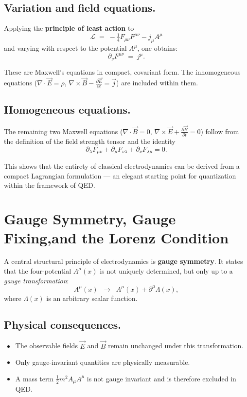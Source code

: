 \subsection*{Variation and field equations.}
Applying the \textbf{principle of least action} to
\[
\mathcal{L} \;=\; -\tfrac{1}{4} F_{\mu\nu}F^{\mu\nu} - j_\mu A^\mu
\]
and varying with respect to the potential \( A^\mu \), one obtains:
\[
\partial_\nu F^{\mu\nu} \;=\; j^\mu .
\]

These are Maxwell’s equations in compact, 
covariant form. The inhomogeneous equations
(\( \nabla \cdot \vec{E} = \rho, \, \nabla \times \vec{B} - \tfrac{\partial \vec{E}}{\partial t} = \vec{j} \))
are included within them.

\subsection*{Homogeneous equations.}
The remaining two Maxwell equations 
(\( \nabla \cdot \vec{B} = 0, \, \nabla \times \vec{E} + \tfrac{\partial \vec{B}}{\partial t} = 0 \))
follow from the definition of the field strength tensor
and the identity
\[
\partial_\lambda F_{\mu\nu} + \partial_\mu F_{\nu\lambda} + \partial_\nu F_{\lambda\mu} = 0 .
\]

\medskip
This shows that the entirety of classical electrodynamics 
can be derived from a compact Lagrangian formulation — 
an elegant starting point for quantization within the framework of QED.
\section{Gauge Symmetry, Gauge Fixing,\newline and the  Lorenz Condition}
\label{anhangA:eichsymmetrie}

A central structural principle of electrodynamics is \textbf{gauge symmetry}.
It states that the four-potential \( A^\mu(x) \) is not uniquely determined,
but only up to a \emph{gauge transformation}:
\[
A^\mu(x) \;\;\rightarrow\;\; A^\mu(x) + \partial^\mu \Lambda(x),
\]
where \( \Lambda(x) \) is an arbitrary scalar function.

\subsection*{Physical consequences.}
\begin{itemize}
	\item The observable fields \( \vec{E} \) and \( \vec{B} \) 
	remain unchanged under this transformation.
	\item Only gauge-invariant quantities are physically measurable.
	\item A mass term \( \tfrac{1}{2} m^2 A_\mu A^\mu \) 
	is not gauge invariant and is therefore excluded in QED.
\end{itemize}

